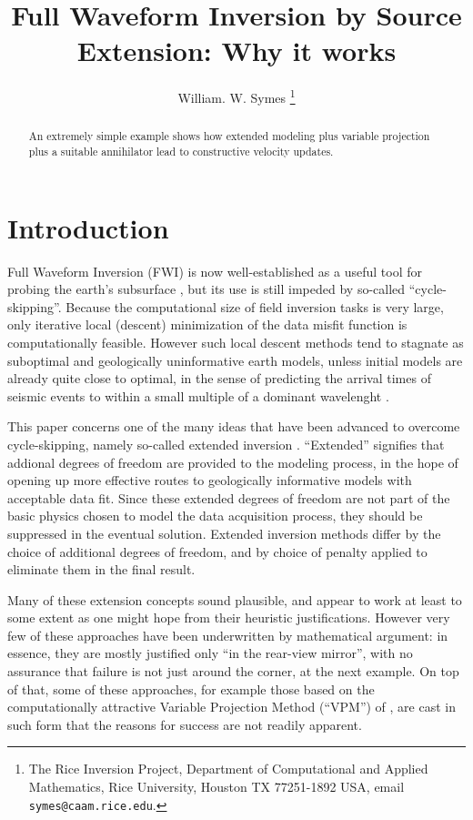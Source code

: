 \title{Full Waveform Inversion by Source Extension: Why it works}
\author{William. W. Symes \thanks{The Rice Inversion Project,
Department of Computational and Applied Mathematics, Rice University,
Houston TX 77251-1892 USA, email {\tt symes@caam.rice.edu}.}}



\maketitle
\begin{abstract}
An extremely simple example shows how extended modeling plus variable projection plus a suitable annihilator lead to constructive velocity updates.
\end{abstract}

\section{Introduction}
Full Waveform Inversion (FWI) is now well-established as
a useful tool for probing the earth's subsurface
\cite[]{VirieuxOperto:09,Fichtner:10}, but its use is still
impeded by so-called ``cycle-skipping''. Because the computational
size of field inversion tasks is very large, only iterative local (descent)
minimization of the data misfit function is computationally
feasible. However such local descent methods tend to stagnate as
suboptimal and geologically uninformative earth models, unless initial
models are already quite close to optimal, in the sense of predicting
the arrival times of seismic events to within a small multiple of a
dominant wavelenght \cite[]{GauTarVir:86,Plessix:10}.

This paper concerns one of the many ideas that have been advanced to
overcome cycle-skipping, namely so-called extended inversion
\cite[]{geoprosp:2008}. ``Extended'' signifies that addional degrees
of freedom are provided to the modeling process, in the hope of
opening up more effective routes to geologically informative models
with acceptable data fit. Since these extended degrees of freedom are
not part of the basic physics chosen to model the data acquisition
process, they should be suppressed in the eventual solution. Extended
inversion methods differ by the choice of additional degrees of
freedom, and by choice of penalty applied to eliminate them in the final
result.

Many of these extension concepts sound
plausible, and appear to work at least to some extent as one might
hope from their heuristic justifications. However very few of these
approaches have been underwritten by mathematical argument: in
essence, they are mostly justified only ``in the rear-view mirror'',
with no assurance that failure is not just around the corner, at the
next example. On top of that, some of these approaches, for example
those based on the computationally attractive Variable Projection
Method (``VPM'') of \cite{GolubPereyra:03}, are cast in such form that the reasons for success are
not readily apparent.

